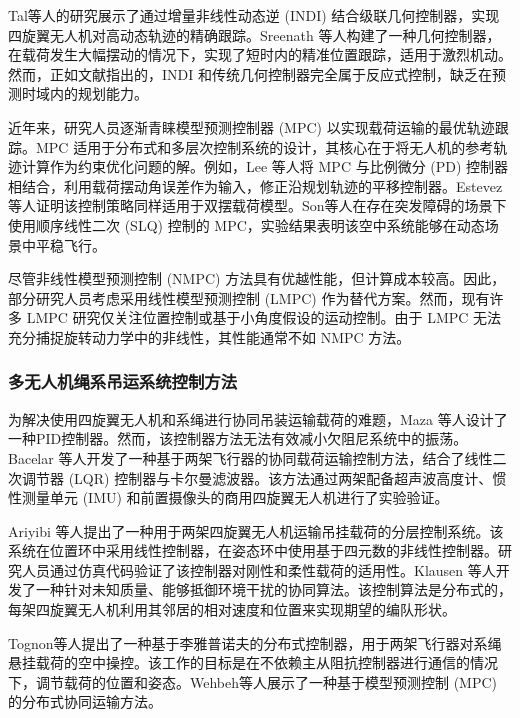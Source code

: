 \documentclass[lang=chs, degree=master, blindreview=false, winfonts=true]{yanputhesis}
\begin{document}
Tal等人的研究展示了通过增量非线性动态逆 (INDI) 结合级联几何控制器，实现四旋翼无人机对高动态轨迹的精确跟踪\cite{2021Accurate}。Sreenath 等人构建了一种几何控制器，在载荷发生大幅摆动的情况下，实现了短时内的精准位置跟踪，适用于激烈机动\cite{sreenath2013geometric}。然而，正如文献指出的，INDI 和传统几何控制器完全属于反应式控制，缺乏在预测时域内的规划能力。

近年来，研究人员逐渐青睐模型预测控制器 (MPC) 以实现载荷运输的最优轨迹跟踪\cite{urbina2021predictive}。MPC 适用于分布式和多层次控制系统的设计，其核心在于将无人机的参考轨迹计算作为约束优化问题的解。例如，Lee 等人将 MPC 与比例微分 (PD) 控制器相结合，利用载荷摆动角误差作为输入，修正沿规划轨迹的平移控制器\cite{lee2015study}。Estevez 等人证明该控制策略同样适用于双摆载荷模型\cite{estevez2021hybrid}。Son等人在存在突发障碍的场景下使用顺序线性二次 (SLQ) 控制的 MPC，实验结果表明该空中系统能够在动态场景中平稳飞行\cite{son2018model}。

尽管非线性模型预测控制 (NMPC) 方法具有优越性能，但计算成本较高\cite{norouzi2022deep}。因此，部分研究人员考虑采用线性模型预测控制 (LMPC) 作为替代方案。然而，现有许多 LMPC 研究仅关注位置控制\cite{bangura2014real}或基于小角度假设的运动控制\cite{alexis2014trajectory}。由于 LMPC 无法充分捕捉旋转动力学中的非线性，其性能通常不如 NMPC 方法\cite{nguyen2021model}。

\subsubsection{多无人机绳系吊运系统控制方法}
为解决使用四旋翼无人机和系绳进行协同吊装运输载荷的难题，Maza 等人设计了一种PID控制器\cite{maza2010multi}。然而，该控制器方法无法有效减小欠阻尼系统中的振荡。Bacelar 等人开发了一种基于两架飞行器的协同载荷运输控制方法，结合了线性二次调节器 (LQR) 控制器与卡尔曼滤波器\cite{bacelar2020board}。该方法通过两架配备超声波高度计、惯性测量单元 (IMU) 和前置摄像头的商用四旋翼无人机进行了实验验证。

Ariyibi 等人提出了一种用于两架四旋翼无人机运输吊挂载荷的分层控制系统。该系统在位置环中采用线性控制器，在姿态环中使用基于四元数的非线性控制器\cite{ariyibi2020quaternion}。研究人员通过仿真代码验证了该控制器对刚性和柔性载荷的适用性。Klausen 等人开发了一种针对未知质量、能够抵御环境干扰的协同算法\cite{klausen2018cooperative}。该控制算法是分布式的，每架四旋翼无人机利用其邻居的相对速度和位置来实现期望的编队形状。

Tognon等人提出了一种基于李雅普诺夫的分布式控制器，用于两架飞行器对系绳悬挂载荷的空中操控\cite{tognon2018aerial}。该工作的目标是在不依赖主从阻抗控制器进行通信的情况下，调节载荷的位置和姿态。Wehbeh等人展示了一种基于模型预测控制 (MPC) 的分布式协同运输方法\cite{wehbeh2020distributed}。
\end{document}
